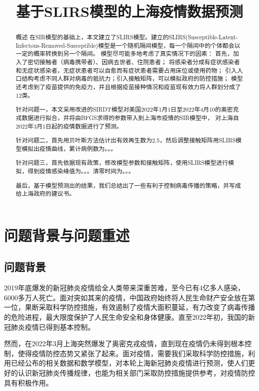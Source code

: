 \documentclass[bwprint]{gmcmthesis}
\title{基于SLIRS模型的上海疫情数据预测}
\numberwithin{figure}{section}
\begin{document}
 \maketitle
 \begin{abstract}
概述
在SIR模型的基础上，本文建立了SLIRS模型。建立的SLIRS(Susceptible-Latent-Infectous-Removed-Susceptible)模型是一个随机隔间模型，每一个隔间中的个体都会以一定的概率转换到另一个隔间。
模型尽可能多地考虑了真实情况下的因素：
首先，加入了密切接触者（病毒携带者）、因病去世者、住院患者；
将感染者分成有症状感染者和无症状感染者，无症状患者可以自愈而有症状患者需要占用床位或使用药物；
引入人口结构考虑不同人群对病毒的抵抗力；引入接触矩阵，可以模拟政府的防控措施；
模型还考虑到了疫苗提供的免疫力，并且根据疫苗接种情况和疫苗现有效力将人群划分成了12类。
\par 针对问题一，本文采用改进的SIRDT模型对美国2022年1月1日至2022年4月10的奥密克戎数据进行拟合，并将由BFGS求得的参数带入到上海市疫情的SIR模型中，
对上海自2022年3月1日起的疫情数据进行了预测。
\par 针对问题二，首先用贝叶斯方法估计出有效再生数为2.5，然后调整接触矩阵用SLIRS模型模拟出疫情曲线，累计病例数为。。。
\par 针对问题三，首先依据现有政策，修改模型参数和接触矩阵，使用SLIRS模型进行模拟，得到疫情感染峰值为。。。清零时间为。。。
\par 最后，基于模型预测出的结果，我们总结出了一些有利于控制病毒传播的策略，并写成给上海政府的建议书。



\end{abstract}


\tableofcontents

\section{问题背景与问题重述}
\subsection{问题背景}
2019年底爆发的新冠肺炎疫情给全人类带来深重苦难，至今已有4亿多人感染，6000多万人死亡。面对突如其来的疫情，中国政府始终将人民生命财产安全放在第一位，果断采取科学防控措施，有效遏制了疫情大面积蔓延，有力改变了病毒传播的危险进程，最大限度保护了人民生命安全和身体健康。直至2022年初，我国的新冠肺炎疫情已得到基本控制。
\par 然而，在2022年3月上海突然爆发了奥密克戎疫情，直到现在疫情仍未得到根本控制，使得疫情防控态势又紧张了起来。面对疫情，需要我们采取科学防控措施，利用已经公布的相关数据和数学模型，对本轮上海新冠肺炎疫情进行预测，使人们更好的认识新冠肺炎传播规律，也能为相关部门采取防控措施提供参考，对疫情防控具有积极作用。
\end{document}
